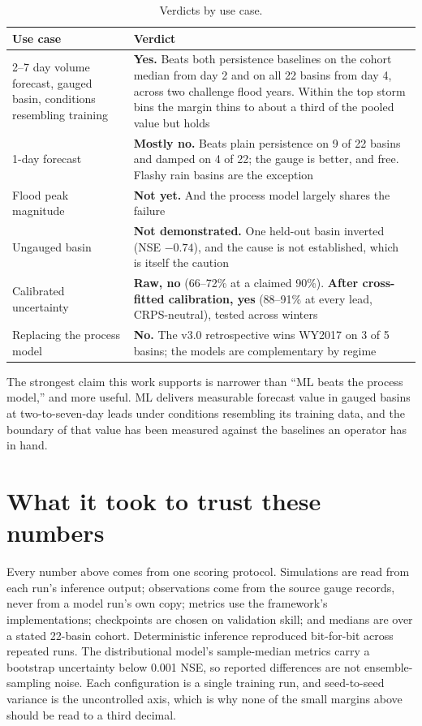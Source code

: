 \documentclass[11pt]{article}
\newcommand{\finding}[1]{\section*{#1}}
\begin{document}
\begin{table}[htbp]
\centering
\caption{Verdicts by use case.}
\label{tab:verdict}
\begin{tabular}{p{}p{}}
\toprule
Use case & Verdict \\
\midrule
2--7 day volume forecast, gauged basin, conditions resembling training & \textbf{Yes.} Beats both persistence baselines on the cohort median from day 2 and on all 22 basins from day 4, across two challenge flood years. Within the top storm bins the margin thins to about a third of the pooled value but holds \\
1-day forecast & \textbf{Mostly no.} Beats plain persistence on 9 of 22 basins and damped on 4 of 22; the gauge is better, and free. Flashy rain basins are the exception \\
Flood peak magnitude & \textbf{Not yet.} And the process model largely shares the failure \\
Ungauged basin & \textbf{Not demonstrated.} One held-out basin inverted (NSE $-0.74$), and the cause is not established, which is itself the caution \\
Calibrated uncertainty & \textbf{Raw, no} (66--72\% at a claimed 90\%). \textbf{After cross-fitted calibration, yes} (88--91\% at every lead, CRPS-neutral), tested across winters \\
Replacing the process model & \textbf{No.} The v3.0 retrospective wins WY2017 on 3 of 5 basins; the models are complementary by regime \\
\bottomrule
\end{tabular}
\end{table}

The strongest claim this work supports is narrower than ``ML beats the process model,''
and more useful. ML delivers measurable forecast value in gauged basins at
two-to-seven-day leads under conditions resembling its training data, and the boundary of
that value has been measured against the baselines an operator has in hand.

\finding{What it took to trust these numbers}

Every number above comes from one scoring protocol. Simulations are read from each run's
inference output; observations come from the source gauge records, never from a model
run's own copy; metrics use the framework's implementations; checkpoints are chosen on
validation skill; and medians are over a stated 22-basin cohort. Deterministic inference
reproduced bit-for-bit across repeated runs. The distributional model's sample-median
metrics carry a bootstrap uncertainty below 0.001 NSE, so reported differences are not
ensemble-sampling noise. Each configuration is a single training run, and seed-to-seed
variance is the uncontrolled axis, which is why none of the small margins above should be
read to a third decimal.
\end{document}
